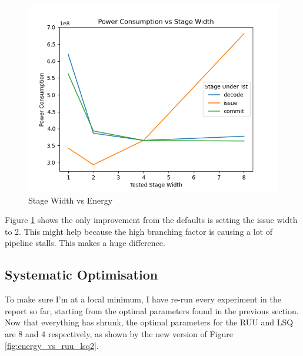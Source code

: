 \documentclass{article}
\newcommand{\optimisation}[1]{
  
}
\begin{document}
\begin{multicols}{2}
  \begin{figure}[H]
    \centering
    \includegraphics[width=\linewidth]{./assets/width_vs_energy.png}
    \caption{Stage Width vs Energy}
    \label{fig:width_vs_energy}
  \end{figure}

  Figure \ref{fig:width_vs_energy} shows the only improvement from the defaults is setting the issue width to 2. This might help because the high branching factor is causing a lot of pipeline stalls. This makes a huge difference.

  \optimisation{width}

  \subsection{Systematic Optimisation}
  To make sure I'm at a local minimum, I have re-run every experiment in the report so far, starting from the optimal parameters found in the previous section. Now that everything has shrunk, the optimal parameters for the RUU and LSQ are 8 and 4 respectively, as shown by the new version of Figure \ref{fig:energy_vs_ruu_lsq2}.


\end{multicols}
\end{document}
